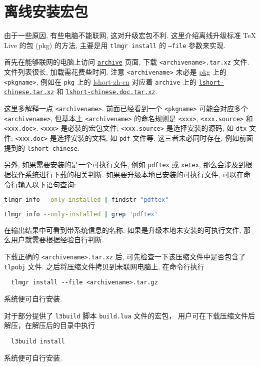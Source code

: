 
\chapter{离线安装宏包}

由于一些原因,
有些电脑不能联网,
这对升级宏包不利.
这里介绍离线升级标准 \TeX{} Live 的包 (pkg) 的方法,
主要是用 \texttt{tlmgr install} 的 \texttt{--file} 参数来实现.

首先在能够联网的电脑上访问
\href{https://ctan.org/tex-archive/systems/texlive/tlnet/archive}{\texttt{archive}}
页面, 下载 \texttt{<archivename>.tar.xz} 文件.
文件列表很长, 加载需花费些时间.
注意 \texttt{<archivename>} 未必是 \href{https://ctan.org/pkg/}{pkg} 上的 \texttt{<pkgname>},
例如在 \texttt{pkg} 上的
\href{https://ctan.org/pkg/lshort-zh-cn}{lshort-zh-cn}
对应着 \texttt{archive} 上的
\href{http://mirrors.ctan.org/systems/texlive/tlnet/archive/lshort-chinese.tar.xz}{\texttt{lshort-chinese.tar.xz}}
和
\href{http://mirrors.ctan.org/systems/texlive/tlnet/archive/lshort-chinese.doc.tar.xz}{\texttt{lshort-chinese.doc.tar.xz}}.

这里多解释一点 \texttt{<archivename>}.
前面已经看到一个 \texttt{<pkgname>} 可能会对应多个 \texttt{<archivename>},
但基本上 \texttt{<archivename>} 的命名规则是 \texttt{<xxx>},
\texttt{<xxx.source>} 和 \texttt{<xxx.doc>}.
\texttt{<xxx>} 是必装的宏包文件;
\texttt{<xxx.source>} 是选择安装的源码, 如 \texttt{dtx} 文件;
\texttt{<xxx.doc>} 是选择安装的文档, 如 \texttt{pdf} 文件等.
这三者未必同时存在, 例如前面提到的 \texttt{lshort-chinese}.

另外, 如果需要安装的是一个可执行文件, 例如 \texttt{pdftex} 或 \texttt{xetex},
那么会涉及到根据操作系统进行下载的相关判断.
如果要升级本地已安装的可执行文件, 可以在命令行输入以下语句查询:
\begin{lstlisting}[language=bash, title={\small\sffamily Windows 系统}]
  tlmgr info --only-installed | findstr "pdftex"
\end{lstlisting}
\begin{lstlisting}[language=bash, title={\small\sffamily Ubuntu 和 Mac 系统}]
  tlmgr info --only-installed | grep 'pdftex'
\end{lstlisting}
在输出结果中可看到带系统信息的名称.
如果是升级本地未安装的可执行文件,
那么用户就需要根据经验自行判断.

下载正确的 \texttt{<archivename>.tar.xz} 后,
可先检查一下该压缩文件中是否包含了 \texttt{tlpobj} 文件.
之后将压缩文件拷贝到未联网电脑上,
在命令行执行
\begin{lstlisting} 
  tlmgr install --file <archivename>.tar.gz 
\end{lstlisting}
系统便可自行安装.

对于部分提供了 \texttt{l3build} 脚本 \texttt{build.lua} 文件的宏包，
用户可在下载压缩文件后解压，在解压后的目录中执行
\begin{lstlisting} 
  l3build install
\end{lstlisting}
系统便可自行安装.
